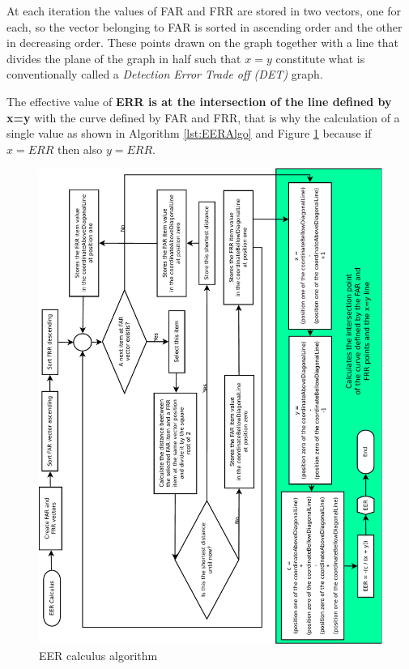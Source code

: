 		\par At each iteration the values of FAR and FRR are stored in two vectors, one for each, so the vector belonging to FAR is sorted in ascending order and the other in decreasing order. These points drawn on the graph together with a line that divides the plane of the graph in half such that $x=y$ constitute what is conventionally called a \textit{Detection Error Trade off (DET)} graph.
		
		\par The effective value of \textbf{ERR is at the intersection of the line defined by x=y} with the curve defined by FAR and FRR, that is why the calculation of a single value as shown in Algorithm \ref{lst:EERAlgo} and Figure \ref{fig:eeralgo} because if $x=ERR$ then also $y=ERR$.
		
		
		
		\begin{figure}[H]
			\centering
			\includegraphics[angle=-90, width=1\linewidth]{images/EERAlgo.pdf}
			\caption{EER calculus algorithm}
			\label{fig:eeralgo}
		\end{figure}

